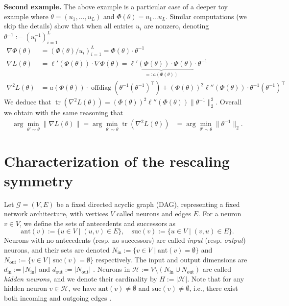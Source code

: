 \documentclass{article}
\theoremstyle{plain}
\theoremstyle{definition}
\theoremstyle{remark}
\def\tr{{\operatorname{tr}}}
\begin{document}
{{\bf Second example.} The above example is a particular case of a deeper toy example where $\theta = 
(u_{1},\ldots,u_{L})$ and $\Phi(\theta) = u_{1}\ldots u_{L}$. Similar computations (we skip the details) show that when all entries $u_{i}$ are nonzero, denoting $\theta^{-1} := (u_{i}^{-1})_{i=1}^{L}$
\begin{align*}
\nabla \Phi(\theta) &= (\Phi(\theta)/u_{i})_{i=1}^{L}= \Phi(\theta) \cdot \theta^{-1}
\\
\nabla L(\theta) &= \ell'(\Phi(\theta)) \cdot \nabla \Phi(\theta) =  \underbrace{\ell'(\Phi(\theta)) \cdot \Phi(\theta)}_{=:a(\Phi(\theta))} \cdot \theta^{-1}\\
\nabla^{2} L(\theta)  &= a(\Phi(\theta)) \cdot  \operatorname{offdiag} (\theta^{-1}
(\theta^{-1})^\top) + (\Phi(\theta))^{2} \ell''(\Phi(\theta)) \cdot \theta^{-1}
(\theta^{-1})^\top
\end{align*}
We deduce that $\tr(\nabla^{2} L(\theta)) =  (\Phi(\theta))^{2} \ell''(\Phi(\theta)) \|\theta^{-1}\|_{2}^{2}$. Overall we obtain with the same reasoning that 
\begin{align}
\arg\min_{\theta' \sim \theta} \|\nabla L(\theta)\|
= \arg\min_{\theta' \sim \theta} \tr(\nabla^{2} L(\theta)) 
&= \arg\min_{\theta' \sim \theta} \|\theta^{-1}\|_{2}.\label{eq:MinGradNormOrHessianTraceIsMinThetaInvNorm}
\end{align}


 


\section{Characterization of the rescaling symmetry}
\label{sec:charac}

Let $\mathcal{G} = (V, E)$ be a fixed directed acyclic graph (DAG), representing a fixed network architecture, with vertices $V$ called neurons and edges $E$. 
For a neuron $v \in V$, we define the sets of antecedents and successors as
\begin{equation}
    \text{ant}(v) := \{u \in V \mid (u,v) \in E\}, \quad \text{suc}(v) := \{u \in V \mid (v,u) \in E\}.
\end{equation}
Neurons with no antecedents (resp. no successors) are called \textit{input} (resp. \textit{output}) neurons, and their sets are denoted $N_{\text{in}} := \{v \in V \mid \text{ant}(v) = \emptyset\}$ and $N_{\text{out}} := \{v \in V \mid \text{suc}(v) = \emptyset\}$ respectively. The input and output dimensions are $d_{\text{in}} := |N_{\text{in}}|$ and $d_{\text{out}} := |N_{\text{out}}|$ .
Neurons in $\mathcal{H} := V \setminus (N_{\text{in}} \cup N_{\text{out}})$ are called \textit{hidden neurons}, and we denote their cardinality by $H := |\mathcal{H}|$. Note that for any hidden neuron $v \in \mathcal{H}$, we have $\text{ant}(v) \neq \emptyset$ and $\text{suc}(v) \neq \emptyset$, i.e., there exist both incoming and outgoing edges \citep[Definition 2.2.2]{gonon2024harnessing}.

}
\end{document}
